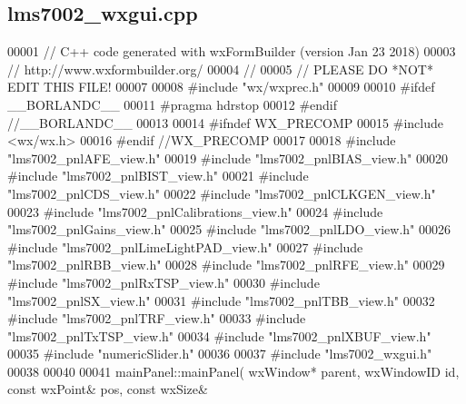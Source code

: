 \subsection{lms7002\+\_\+wxgui.\+cpp}
\label{lms7002__wxgui_8cpp_source}

\begin{DoxyCode}
00001 \textcolor{comment}{// C++ code generated with wxFormBuilder (version Jan 23 2018)}
00003 \textcolor{comment}{// http://www.wxformbuilder.org/}
00004 \textcolor{comment}{//}
00005 \textcolor{comment}{// PLEASE DO *NOT* EDIT THIS FILE!}
00007 \textcolor{comment}{}
00008 \textcolor{preprocessor}{#include "wx/wxprec.h"}
00009 
00010 \textcolor{preprocessor}{#ifdef \_\_BORLANDC\_\_}
00011 \textcolor{preprocessor}{#pragma hdrstop}
00012 \textcolor{preprocessor}{#endif //\_\_BORLANDC\_\_}
00013 
00014 \textcolor{preprocessor}{#ifndef WX\_PRECOMP}
00015 \textcolor{preprocessor}{#include <wx/wx.h>}
00016 \textcolor{preprocessor}{#endif //WX\_PRECOMP}
00017 
00018 \textcolor{preprocessor}{#include "lms7002_pnlAFE_view.h"}
00019 \textcolor{preprocessor}{#include "lms7002_pnlBIAS_view.h"}
00020 \textcolor{preprocessor}{#include "lms7002_pnlBIST_view.h"}
00021 \textcolor{preprocessor}{#include "lms7002_pnlCDS_view.h"}
00022 \textcolor{preprocessor}{#include "lms7002_pnlCLKGEN_view.h"}
00023 \textcolor{preprocessor}{#include "lms7002_pnlCalibrations_view.h"}
00024 \textcolor{preprocessor}{#include "lms7002_pnlGains_view.h"}
00025 \textcolor{preprocessor}{#include "lms7002_pnlLDO_view.h"}
00026 \textcolor{preprocessor}{#include "lms7002_pnlLimeLightPAD_view.h"}
00027 \textcolor{preprocessor}{#include "lms7002_pnlRBB_view.h"}
00028 \textcolor{preprocessor}{#include "lms7002_pnlRFE_view.h"}
00029 \textcolor{preprocessor}{#include "lms7002_pnlRxTSP_view.h"}
00030 \textcolor{preprocessor}{#include "lms7002_pnlSX_view.h"}
00031 \textcolor{preprocessor}{#include "lms7002_pnlTBB_view.h"}
00032 \textcolor{preprocessor}{#include "lms7002_pnlTRF_view.h"}
00033 \textcolor{preprocessor}{#include "lms7002_pnlTxTSP_view.h"}
00034 \textcolor{preprocessor}{#include "lms7002_pnlXBUF_view.h"}
00035 \textcolor{preprocessor}{#include "numericSlider.h"}
00036 
00037 \textcolor{preprocessor}{#include "lms7002_wxgui.h"}
00038 
00040 
00041 mainPanel::mainPanel( wxWindow* parent, wxWindowID \textcolor{keywordtype}{id}, \textcolor{keyword}{const} wxPoint& pos, \textcolor{keyword}{const} wxSize& 

\end{DoxyCode}
